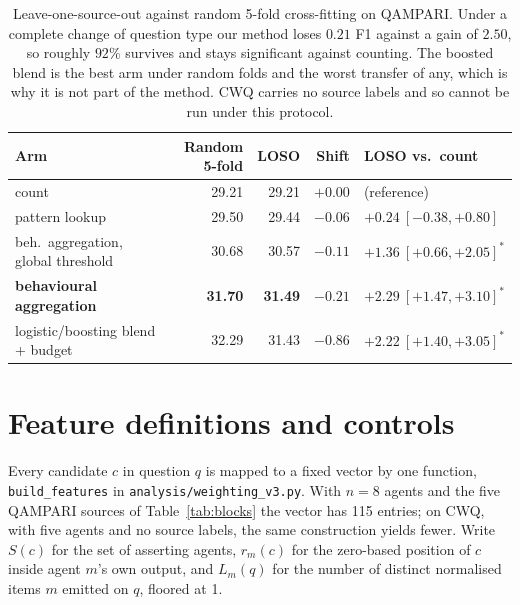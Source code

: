 \documentclass{article}
\begin{document}
\begin{table}
  \caption{Leave-one-source-out against random 5-fold cross-fitting on QAMPARI. Under a complete change of question type our method loses $0.21$ F1 against a gain of $2.50$, so roughly $92\%$ survives and stays significant against counting. The boosted blend is the best arm under random folds and the worst transfer of any, which is why it is not part of the method. CWQ carries no source labels and so cannot be run under this protocol.}
  \label{tab:loso}
  \centering
  \begin{tabular}{lrrrl}
    \toprule
    Arm & Random 5-fold & LOSO & Shift & LOSO vs.\ count \\
    \midrule
    count                        & 29.21 & 29.21 & $+0.00$ & (reference) \\
    pattern lookup               & 29.50 & 29.44 & $-0.06$ & $+0.24\ [-0.38,+0.80]$ \\
    beh.\ aggregation, global threshold & 30.68 & 30.57 & $-0.11$ & $+1.36\ [+0.66,+2.05]^*$ \\
    \textbf{behavioural aggregation} & \textbf{31.70} & \textbf{31.49} & $\mathbf{-0.21}$ & $\mathbf{+2.29\ [+1.47,+3.10]^*}$ \\
    logistic/boosting blend + budget & 32.29 & 31.43 & $-0.86$ & $+2.22\ [+1.40,+3.05]^*$ \\
    \bottomrule
  \end{tabular}
\end{table}

\section{Feature definitions and controls}
\label{app:features}

Every candidate $c$ in question $q$ is mapped to a fixed vector by one function, \texttt{build\_features} in \texttt{analysis/weighting\_v3.py}. With $n=8$ agents and the five QAMPARI sources of Table~\ref{tab:blocks} the vector has 115 entries; on CWQ, with five agents and no source labels, the same construction yields fewer. Write $S(c)$ for the set of asserting agents, $r_m(c)$ for the zero-based position of $c$ inside agent $m$'s own output, and $L_m(q)$ for the number of distinct normalised items $m$ emitted on $q$, floored at 1.
\end{document}
